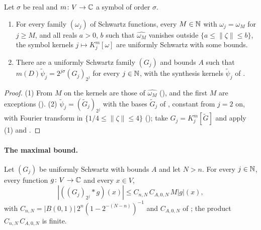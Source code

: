 \begin{corollary}
\label{cor:symbol-psi-dual}
\leanok
{}
Let $\sigma$ be real and $m \colon V \to \mathbb{C}$ a symbol of order $\sigma$.
\begin{enumerate}
  \item For every family $(\omega_j)$ of Schwartz functions, every $M \in \mathbb{N}$ with
    $\omega_j = \omega_M$ for $j \geq M$, and all reals $a > 0$, $b$ such that
    $\widehat{\omega_M}$ vanishes outside $\{a \leq \|\zeta\| \leq b\}$, the symbol kernels
    $j \mapsto K^m_j[\omega]$ are uniformly Schwartz with some bounds.
  \item There are a uniformly Schwartz family $(G_j)$ and bounds $A$ such that
    $m(D) \tilde\psi_j = 2^{j\sigma} (G_j)_{2^j}$ for every $j \in \mathbb{N}$, with the synthesis
    kernels $\tilde\psi_j$ of .
\end{enumerate}
\end{corollary}

\begin{proof}
\leanok
(1) From $M$ on the kernels are those of $\widehat{\omega_M}$
(), and the first $M$ are exceptions
(). (2) $\tilde\psi_j = (\tilde G_j)_{2^j}$ with the bases
$\tilde G_j$ of , constant from $j = 2$ on, with Fourier transform in
$\{1/4 \leq \|\zeta\| \leq 4\}$ (); take
$G_j = K^m_j[\tilde G]$ and apply (1) and .
\end{proof}

\paragraph{The maximal bound.}

\begin{theorem}
\label{thm:uniform-family-maximal}
\leanok
{}
Let $(G_j)$ be uniformly Schwartz with bounds $A$ and let $N > n$. For every $j \in \mathbb{N}$, every
function $g \colon V \to \mathbb{C}$ and every $x \in V$,
\[
  |((G_j)_{2^j} \ast g)(x)| \leq C_{n,N} \, C_{A,0,N} \, M|g|(x) ,
\]
with $C_{n,N} = |B(0, 1)| \, 2^n (1 - 2^{-(N - n)})^{-1}$ and $C_{A,0,N}$ of
; the product $C_{n,N} \, C_{A,0,N}$ is finite.
\end{theorem}

